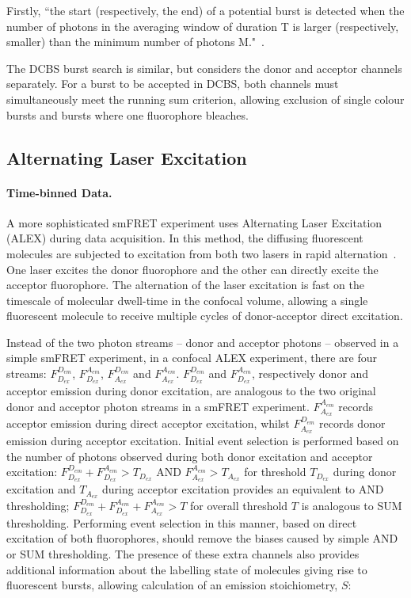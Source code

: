 Firstly, ``the start (respectively, the end) of a potential burst is detected when the number of photons in the averaging window of duration T is larger (respectively, smaller) than the minimum number of photons M."~\cite{nir06}.

The DCBS burst search is similar, but considers the donor and acceptor channels separately. For a burst to be accepted in DCBS, both channels must simultaneously meet the running sum criterion, allowing exclusion of single colour bursts and bursts where one fluorophore bleaches.

\subsection{Alternating Laser Excitation}
\paragraph{Time-binned Data.}
A more sophisticated smFRET experiment uses Alternating Laser Excitation (ALEX) during data acquisition. In this method, the diffusing fluorescent molecules are subjected to excitation from both two lasers in rapid alternation~\cite{kapanidis05}. One laser excites the donor fluorophore and the other can directly excite the acceptor fluorophore. The alternation of the laser excitation is fast on the timescale of molecular dwell-time in the confocal volume, allowing a single fluorescent molecule to receive multiple cycles of donor-acceptor direct excitation.

Instead of the two photon streams -- donor and acceptor photons -- observed in a simple smFRET experiment, in a confocal ALEX experiment, there are four streams: $F_{D_{ex}}^{D_{em}}$, $F_{D_{ex}}^{A_{em}}$, $F_{A_{ex}}^{D_{em}}$ and $F_{A_{ex}}^{A_{em}}$. $F_{D_{ex}}^{D_{em}}$ and $F_{D_{ex}}^{A_{em}}$, respectively donor and acceptor emission during donor excitation, are analogous to the two original donor and acceptor photon streams in a smFRET experiment. $F_{A_{ex}}^{A_{em}}$ records acceptor emission during direct acceptor excitation, whilst $F_{A_{ex}}^{D_{em}}$ records donor emission during acceptor excitation. Initial event selection is performed based on the number of photons observed during both donor excitation and acceptor excitation: $F_{D_{ex}}^{D_{em}} + F_{D_{ex}}^{A_{em}} > T_{D_{ex}}$ AND $F_{A_{ex}}^{A_{em}} > T_{A_{ex}}$ for threshold $T_{D_{ex}}$ during donor excitation and $T_{A_{ex}}$ during acceptor excitation provides an equivalent to AND thresholding; $F_{D_{ex}}^{D_{em}} + F_{D_{ex}}^{A_{em}} + F_{A_{ex}}^{A_{em}} > T$ for overall threshold $T$ is analogous to SUM thresholding. Performing event selection in this manner, based on direct excitation of both fluorophores, should remove the biases caused by simple AND or SUM thresholding. The presence of these extra channels also provides additional information about the labelling state of molecules giving rise to fluorescent bursts, allowing calculation of an emission stoichiometry, $S$:

